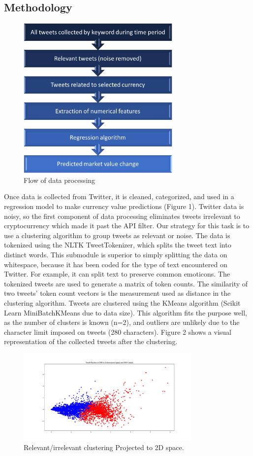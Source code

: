 \documentclass[sigconf]{acmart}
\begin{document}
\subsection{Methodology}

\begin{figure}[H]
\caption{Flow of data processing}
\includegraphics[width=8cm]{chart.png}
\end{figure}

Once data is collected from Twitter, it is cleaned, categorized, and used in a regression model to make currency value predictions (Figure 1). Twitter data is noisy, so the first component of data processing eliminates tweets irrelevant to cryptocurrency which made it past the API filter. Our strategy for this task is to use a clustering algorithm to group tweets as relevant or noise. The data is tokenized using the NLTK TweetTokenizer, which splits the tweet text into distinct words. This submodule is superior to simply splitting the data on whitespace, because it has been coded for the type of text encountered on Twitter. For example, it can split text to preserve common emoticons. The tokenized tweets are used to generate a matrix of token counts. The similarity of two tweets' token count vectors is the measurement used as distance in the clustering algorithm. Tweets are clustered using the KMeans algorithm (Scikit Learn MiniBatchKMeans due to data size). This algorithm fits the purpose well, as the number of clusters is known (n=2), and outliers are unlikely due to the character limit imposed on tweets (280 characters). Figure 2 shows a visual representation of the collected tweets after the clustering.

\begin{figure}[H]
\caption{Relevant/irrelevant clustering Projected to 2D space.}
\includegraphics[width=9cm]{3pass.png}
\end{figure}
\end{document}
